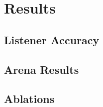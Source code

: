 \section{Results}\label{sec:results}

\subsection{Listener Accuracy}

\subsection{Arena Results}

\subsection{Ablations}
